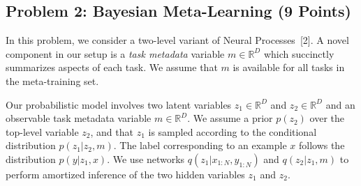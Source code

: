 \documentclass[12pt]{article}
\begin{document}
\subsection*{Problem 2: Bayesian Meta-Learning (9 Points)}
In this problem, we consider a two-level variant of Neural Processes~[2].
A novel component in our setup is a \textit{task metadata} variable $m \in \mathbb{R}^D$ which succinctly summarizes aspects of each task.
We assume that $m$ is available for all tasks in the meta-training set.

Our probabilistic model involves two latent variables $z_1 \in \mathbb{R}^D$ and $z_2 \in \mathbb{R}^D$ and an observable task metadata variable $m \in \mathbb{R}^D$.
We assume a prior $p(z_2)$ over the top-level variable $z_2$, and that $z_1$ is sampled according to the conditional distribution $p(z_1 | z_2, m)$.
The label corresponding to an example $x$ follows the distribution $p(y | z_1, x)$.
We use networks $q(z_1 | x_{1:N}, y_{1:N})$ and $q(z_2 | z_1, m)$ to perform amortized inference of the two hidden variables $z_1$ and $z_2$.
\end{document}
